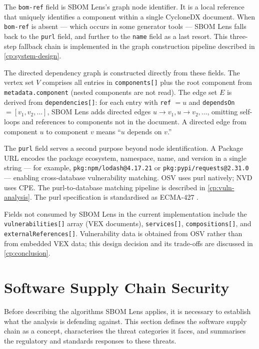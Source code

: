 The \texttt{bom-ref} field is SBOM Lens's graph node identifier. It is a local reference that uniquely identifies a component within a single CycloneDX document. When \texttt{bom-ref} is absent --- which occurs in some generator tools --- SBOM Lens falls back to the \texttt{purl} field, and further to the \texttt{name} field as a last resort. This three-step fallback chain is implemented in the graph construction pipeline described in \autoref{cp:system-design}.

The directed dependency graph is constructed directly from these fields. The vertex set \(V\) comprises all entries in \texttt{components[]} plus the root component from \texttt{metadata.component} (nested components are not read). The edge set \(E\) is derived from \texttt{dependencies[]}: for each entry with \texttt{ref} \(= u\) and \texttt{dependsOn} \(= [v_1, v_2, \ldots]\), SBOM Lens adds directed edges \(u \to v_1, u \to v_2, \ldots\), omitting self-loops and references to components not in the document. A directed edge from component \(u\) to component \(v\) means ``\(u\) depends on \(v\).''

The \texttt{purl} field serves a second purpose beyond node identification. A Package URL encodes the package ecosystem, namespace, name, and version in a single string --- for example, \texttt{pkg:npm/lodash@4.17.21} or \texttt{pkg:pypi/requests@2.31.0} --- enabling cross-database vulnerability matching. OSV uses purl natively; NVD uses CPE. The purl-to-database matching pipeline is described in \autoref{cp:vuln-analysis}. The purl specification is standardised as ECMA-427 \citep{PurlSpec}.

Fields not consumed by SBOM Lens in the current implementation include the \texttt{vulnerabilities[]} array (VEX documents), \texttt{services[]}, \texttt{compositions[]}, and \texttt{externalReferences[]}. Vulnerability data is obtained from OSV rather than from embedded VEX data; this design decision and its trade-offs are discussed in \autoref{cp:conclusion}.


\section{Software Supply Chain Security}
\label{sec:supply-chain-security}

Before describing the algorithms SBOM Lens applies, it is necessary to establish what the analysis is defending against. This section defines the software supply chain as a concept, characterises the threat categories it faces, and summarises the regulatory and standards responses to these threats.


